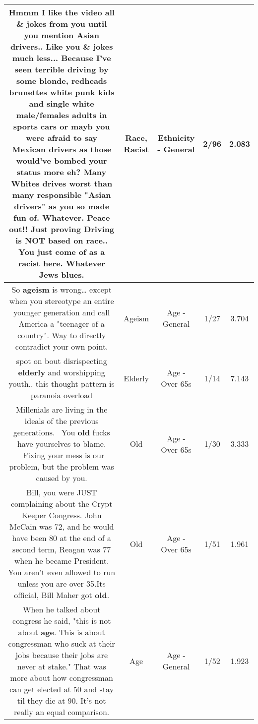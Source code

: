 \documentclass[11pt]{article}
\newlength\mylength
\begin{document}
\begin{center}
\begin{longtable}{|C{.65\mylength}|C{.30\mylength}|C{.12\mylength}|C{.12\mylength}|C{.12\mylength}|}
  \small Hmmm I like the video all \& jokes from you until you mention Asian drivers.. Like you \& jokes much less... Because I've seen terrible driving by some blonde, redheads brunettes white punk kids and single white male/females adults in sports cars or mayb you were afraid to say Mexican drivers as those would've bombed your status more eh? Many Whites drives worst than many responsible "Asian drivers" as you so made fun of. Whatever. Peace out!! Just proving Driving is NOT based on \textbf{race}.. You just come of as a \textbf{racist} here. Whatever Jews blues.\normalsize   & Race, Racist & Ethnicity - General & 2/96 & 2.083 \\  \hline
  \small So \textbf{ageism} is wrong… except when you stereotype an entire younger generation and call America a "teenager of a country". Way to directly contradict your own point.\normalsize   & Ageism & Age - General & 1/27 & 3.704 \\  \hline
  \small spot on bout disrispecting \textbf{elderly} and worshipping youth.. this thought pattern is paranoia overload\normalsize   & Elderly & Age - Over 65s & 1/14 & 7.143 \\  \hline
  \small Millenials are living in the ideals of the previous generations.  You \textbf{old} fucks have yourselves to blame.  Fixing your mess is our problem, but the problem was caused by you.\normalsize   & Old & Age - Over 65s & 1/30 & 3.333 \\  \hline
  \small Bill, you were JUST complaining about the Crypt Keeper Congress. John McCain was 72, and he would have been 80 at the end of a second term, Reagan was 77 when he became President. You aren't even allowed to run unless you are over 35.Its official, Bill Maher got \textbf{old}.\normalsize   & Old & Age - Over 65s & 1/51 & 1.961 \\  \hline
  \small When he talked about congress he said, "this is not about \textbf{age}. This is about congressman who suck at their jobs because their jobs are never at stake." That was more about how congressman can get elected at 50 and stay til they die at 90. It's not really an equal comparison.\normalsize   & Age & Age - General & 1/52 & 1.923 \\  \hline

\end{longtable}
\end{center}
\end{document}
